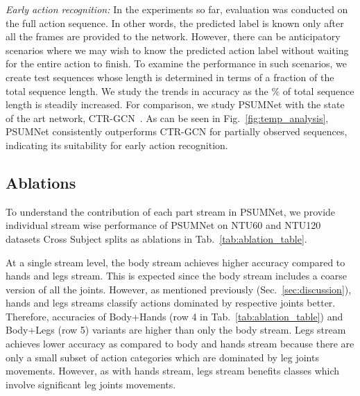 \documentclass[runningheads]{llncs}
\begin{document}
\noindent \textit{Early action recognition:} In the experiments so far, evaluation was conducted on the full action sequence. In other words, the predicted label is known only after all the frames are provided to the network. However, there can be anticipatory scenarios where we may wish to know the predicted action label without waiting for the entire action to finish. To examine the performance in such scenarios, we create test sequences whose length is determined in terms of a fraction of the total sequence length. We study the trends in accuracy as the \% of total sequence length is steadily increased. For comparison, we study PSUMNet with the state of the art network, CTR-GCN~\cite{chen2021channel}. As can be seen in Fig.~\ref{fig:temp_analysis}, PSUMNet consistently outperforms CTR-GCN for partially observed sequences, indicating its suitability for early action recognition.

\subsection{Ablations}
\label{sec:ablation}


To understand the contribution of each part stream in PSUMNet, we provide individual stream wise performance of PSUMNet on NTU60 and NTU120 datasets Cross Subject splits as ablations in Tab.~\ref{tab:ablation_table}.

At a single stream level, the body stream achieves higher accuracy compared to hands and legs stream. This is expected since the body stream includes a coarse version of all the joints. However, as mentioned previously (Sec.~\ref{sec:discussion}), hands and legs streams classify actions dominated by respective joints better. Therefore, accuracies of Body+Hands (row 4 in Tab.~\ref{tab:ablation_table}) and Body+Legs (row 5) variants are higher than  only the body stream. Legs stream achieves lower accuracy as compared to body and hands stream because there are only a small subset of action categories which are dominated by leg joints movements. However, as with hands stream, legs stream benefits classes which involve significant leg joints movements.
\end{document}
